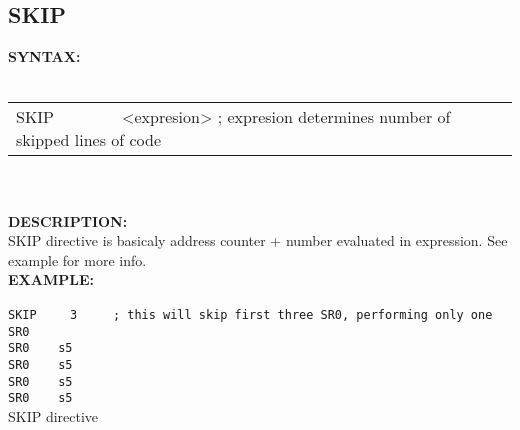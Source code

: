                 \subsection{SKIP}
                \textbf{SYNTAX:}\\
                \\ {
                    \texttt{}
                    \begin{tabular}[h!]{llll}
                        { \color{highlight_directive} SKIP }\verb`       `{ \color{highlight_constant} <expresion> }
                        { \color{highlight_comment} ; expresion determines number of skipped lines of code  }\\
                    \end{tabular}
                    }\\
                    \\
                \textbf{DESCRIPTION:}\\
                SKIP directive is basicaly address counter + number evaluated in expression. See example for more info.\\
                \textbf{EXAMPLE:}\\
                        \begin{code}[h!]
                            {\color{highlight_directive}\verb'SKIP'}\verb'    '
                            {\color{highlight_constant}\verb'3'}\verb'    '{\color{highlight_comment}\verb' ; this will skip first three SR0, performing only one SR0'}\\
                            {\color{highlight_instruction}\verb'SR0'}\verb'    '{\color{highlight_symbol}\verb's5'}\\
                            {\color{highlight_instruction}\verb'SR0'}\verb'    '{\color{highlight_symbol}\verb's5'}\\
                            {\color{highlight_instruction}\verb'SR0'}\verb'    '{\color{highlight_symbol}\verb's5'}\\
                            {\color{highlight_instruction}\verb'SR0'}\verb'    '{\color{highlight_symbol}\verb's5'}\\
                            \caption{SKIP directive}
                        \end{code}

